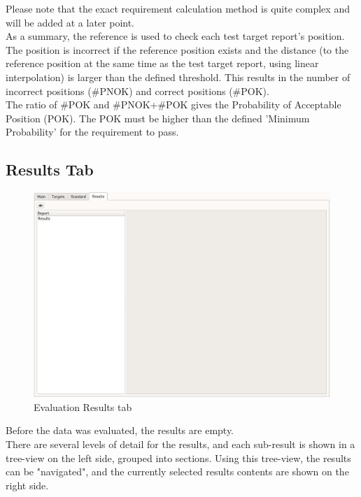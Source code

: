 Please note that the exact requirement calculation method is quite complex and will be added at a later point. \\

As a summary, the reference is used to check each test target report's position. The position is incorrect if the reference position exists and the distance (to the reference position at the same time as the test target report, using linear interpolation) is larger than the defined threshold. This results in the number of incorrect positions (\#PNOK) and correct positions (\#POK). \\

The ratio of \#POK and \#PNOK+\#POK gives the Probability of Acceptable Position (POK). The POK must be higher than the defined 'Minimum Probability' for the requirement to pass.

\subsection{Results Tab}

\begin{figure}[H]
  \hspace*{-2cm}
    \includegraphics[width=18cm,frame]{../screenshots/eval_results_empty.png}
  \caption{Evaluation Results tab}
\end{figure}

Before the data was evaluated, the results are empty.\\

There are several levels of detail for the results, and each sub-result is shown in a tree-view on the left side, grouped into sections. Using this tree-view, the results can be "navigated", and the currently selected results contents are shown on the right side. \\

